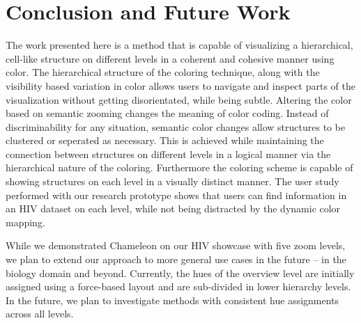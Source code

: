 \documentclass{egpubl}
\begin{document}
	
	
	
	\section{Conclusion and Future Work}
	The work presented here is a method that is capable of visualizing a hierarchical, cell-like structure on different levels in a coherent and cohesive manner using color. 
	The hierarchical structure of the coloring technique, along with the visibility based variation in color allows users to navigate and inspect parts of the visualization without getting disorientated, while being subtle.
	Altering the color based on semantic zooming changes the meaning of color coding.
	Instead of discriminability for any situation, semantic color changes allow structures to be clustered or seperated as necessary.
	This is achieved while maintaining the connection between structures on different levels in a logical manner via the hierarchical nature of the coloring.
	Furthermore the coloring scheme is capable of showing structures on each level in a visually distinct manner. 
	The user study performed with our research prototype shows that users can find information in an HIV dataset on each level, while not being distracted by the dynamic color mapping. 
	
	While we demonstrated Chameleon on our HIV showcase with five zoom levels, we plan to extend our approach to more general use cases in the future -- in the biology domain and beyond.
	Currently, the hues of the overview level are initially assigned using a force-based layout and are sub-divided in lower hierarchy levels. 
	In the future, we plan to investigate methods with consistent hue assignments across all levels.
	
\end{document}
